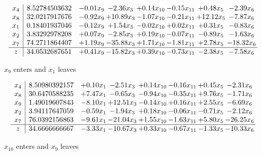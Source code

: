 \documentclass[8pt]{article}
\begin{document}
 \[\begin{array}{c| c c@{\hskip 2pt} c@{\hskip 2pt} c@{\hskip 2pt} c@{\hskip 2pt} c@{\hskip 2pt} c@{\hskip 2pt} }
 x_{4}   &  8.52784503632 & -0.01 x_{9} & -2.36 x_{3} & +  0.14 x_{10} & -0.15 x_{11} & +  0.48 x_{5} & -2.39 x_{6}\\
 x_{8}   &  32.0217917676 & -0.92 x_{9} & + 10.89 x_{3} & -1.07 x_{10} & -0.21 x_{11} & + 12.12 x_{5} & -7.87 x_{6}\\
 x_{1}   &  0.18401937046 & -0.12 x_{9} & +  1.54 x_{3} & -0.02 x_{10} & +  0.02 x_{11} & +  0.31 x_{5} & -0.83 x_{6}\\
 x_{2}   &  3.83292978208 & +  0.07 x_{9} & -2.85 x_{3} & +  0.19 x_{10} & -0.07 x_{11} & -0.89 x_{5} & -1.63 x_{6}\\
 x_{7}   &  74.2711864407 & +  1.19 x_{9} & -35.88 x_{3} & +  1.71 x_{10} & -1.81 x_{11} & +  2.78 x_{5} & -18.32 x_{6}\\
\hline
z    &  34.0532687651 & +  0.41 x_{9} & -15.82 x_{3} & +  0.39 x_{10} & -0.73 x_{11} & -2.38 x_{5} & -7.58 x_{6}\\
\end{array}\]


 $ x_{9} $ enters and $ x_{1} $ leaves 

 \[\begin{array}{c| c c@{\hskip 2pt} c@{\hskip 2pt} c@{\hskip 2pt} c@{\hskip 2pt} c@{\hskip 2pt} c@{\hskip 2pt} }
 x_{4}   &  8.50980392157 & +  0.10 x_{1} & -2.51 x_{3} & +  0.14 x_{10} & -0.16 x_{11} & +  0.45 x_{5} & -2.31 x_{6}\\
 x_{8}   &  30.6470588235 & +  7.47 x_{1} & -0.65 x_{3} & -0.94 x_{10} & -0.35 x_{11} & +  9.76 x_{5} & -1.71 x_{6}\\
 x_{9}   &  1.49019607843 & -8.10 x_{1} & + 12.51 x_{3} & -0.14 x_{10} & +  0.16 x_{11} & +  2.55 x_{5} & -6.69 x_{6}\\
 x_{2}   &  3.94117647059 & -0.59 x_{1} & -1.94 x_{3} & +  0.18 x_{10} & -0.06 x_{11} & -0.71 x_{5} & -2.12 x_{6}\\
 x_{7}   &  76.0392156863 & -9.61 x_{1} & -21.04 x_{3} & +  1.55 x_{10} & -1.63 x_{11} & +  5.80 x_{5} & -26.25 x_{6}\\
\hline
z    &  34.6666666667 & -3.33 x_{1} & -10.67 x_{3} & +  0.33 x_{10} & -0.67 x_{11} & -1.33 x_{5} & -10.33 x_{6}\\
\end{array}\]


 $ x_{10} $ enters and $ x_{9} $ leaves 
\end{document}
